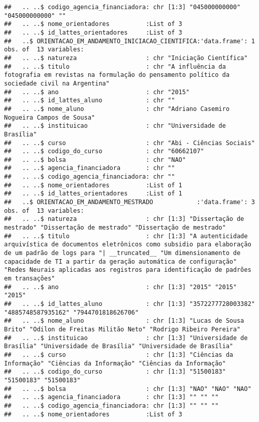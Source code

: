 \documentclass[]{article}
\begin{document}
\begin{verbatim}
##   .. ..$ codigo_agencia_financiadora: chr [1:3] "045000000000" "045000000000" ""
##   .. ..$ nome_orientadores          :List of 3
##   .. ..$ id_lattes_orientadores     :List of 3
##   ..$ ORIENTACAO_EM_ANDAMENTO_INICIACAO_CIENTIFICA:'data.frame': 1 obs. of  13 variables:
##   .. ..$ natureza                   : chr "Iniciação Científica"
##   .. ..$ titulo                     : chr "A influência da fotografia em revistas na formulação do pensamento político da sociedade civil na Argentina"
##   .. ..$ ano                        : chr "2015"
##   .. ..$ id_lattes_aluno            : chr ""
##   .. ..$ nome_aluno                 : chr "Adriano Casemiro Nogueira Campos de Sousa"
##   .. ..$ instituicao                : chr "Universidade de Brasília"
##   .. ..$ curso                      : chr "Abi - Ciências Sociais"
##   .. ..$ codigo_do_curso            : chr "60662107"
##   .. ..$ bolsa                      : chr "NAO"
##   .. ..$ agencia_financiadora       : chr ""
##   .. ..$ codigo_agencia_financiadora: chr ""
##   .. ..$ nome_orientadores          :List of 1
##   .. ..$ id_lattes_orientadores     :List of 1
##   ..$ ORIENTACAO_EM_ANDAMENTO_MESTRADO            :'data.frame': 3 obs. of  13 variables:
##   .. ..$ natureza                   : chr [1:3] "Dissertação de mestrado" "Dissertação de mestrado" "Dissertação de mestrado"
##   .. ..$ titulo                     : chr [1:3] "A autenticidade arquivística de documentos eletrônicos como subsidio para elaboração de um padrão de logs para "| __truncated__ "Um dimensionamento de capacidade de TI a partir da geração automática de configuração" "Redes Neurais aplicadas aos registros para identificação de padrões em transações"
##   .. ..$ ano                        : chr [1:3] "2015" "2015" "2015"
##   .. ..$ id_lattes_aluno            : chr [1:3] "3572277728003382" "4885748587935162" "7944701818626706"
##   .. ..$ nome_aluno                 : chr [1:3] "Lucas de Sousa Brito" "Odilon de Freitas Militão Neto" "Rodrigo Ribeiro Pereira"
##   .. ..$ instituicao                : chr [1:3] "Universidade de Brasília" "Universidade de Brasília" "Universidade de Brasília"
##   .. ..$ curso                      : chr [1:3] "Ciências da Informação" "Ciências da Informação" "Ciências da Informação"
##   .. ..$ codigo_do_curso            : chr [1:3] "51500183" "51500183" "51500183"
##   .. ..$ bolsa                      : chr [1:3] "NAO" "NAO" "NAO"
##   .. ..$ agencia_financiadora       : chr [1:3] "" "" ""
##   .. ..$ codigo_agencia_financiadora: chr [1:3] "" "" ""
##   .. ..$ nome_orientadores          :List of 3

\end{verbatim}
\end{document}
